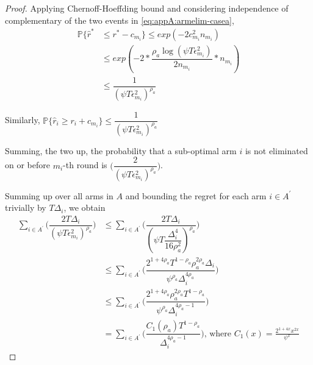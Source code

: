 \begin{proof}
 
% 
Applying Chernoff-Hoeffding bound and considering independence of complementary of the two events in \ref{eq:appA:armelim-casea},
  \begin{align*}
\mathbb{P}\lbrace\hat{r}^{*}&\leq r^{*} - c_{m_{i}}\rbrace\leq exp(-2c_{m_{i}}^{2}n_{m_{i}})\\
&\leq exp(-2 * \dfrac{\rho_{a}\log (\psi T\epsilon_{m_{i}}^{2})}{2 n_{m_{i}}} *n_{m_{i}})\\
&\leq \dfrac{1}{(\psi T\epsilon_{m_{i}}^{2})^{\rho_{a}}}   
  \end{align*}
 
 
Similarly, $\mathbb{P}\lbrace\hat{r}_{i}\geq r_{i} + c_{m_{i}}\rbrace\leq \dfrac{1}{(\psi  T\epsilon_{m_{i}}^{2})^{\rho_{a}}}$
 
Summing, the two up, the probability that a sub-optimal arm ${i}$ is not eliminated on or before $m_{i}$-th round is  $\bigg(\dfrac{2}{(\psi T\epsilon_{m_{i}}^{2})^{\rho_{a}}}\bigg)$. 
 
Summing up over all arms in $A$ and bounding the regret for each arm $i\in A^{'}$ trivially by $T\Delta_{i}$, we obtain
   \begin{align*}
\sum_{i\in A^{'}}\bigg(\dfrac{2T\Delta_{i}}{(\psi T\epsilon_{m_{i}}^{2})^{\rho_{a}}}\bigg)
&\leq\sum_{i\in A^{'}}\bigg(\dfrac{2T\Delta_{i}}{(\psi T\dfrac{\Delta_{i}^{4}}{16\rho_{a}^{2}})^{\rho_{a}}}\bigg)\\
&\leq \sum_{i\in A^{'}}\bigg(\dfrac{2^{1+4\rho_{a}}T^{1-\rho_{a}}\rho_{a}^{2\rho_{a}}\Delta_{i}}{\psi^{\rho_{a}}\Delta_{i}^{4\rho_{a}}}\bigg)\\
&\leq \sum_{i\in A^{'}}\bigg(\dfrac{2^{1+4\rho_{a}}\rho_{a}^{2\rho_{a}}T^{1-\rho_{a}}}{\psi^{\rho_{a}}\Delta_{i}^{4\rho_{a}-1}}\bigg)\\   
& =\sum_{i\in A^{'}}\bigg(\dfrac{C_{1}(\rho_{a})T^{1-\rho_{a}}}{\Delta_{i}^{4\rho_{a}-1}}\bigg) \text{, where } C_1(x) = \frac{2^{1+4x}x^{2x}}{\psi^{x}}
   \end{align*}


\end{proof}
